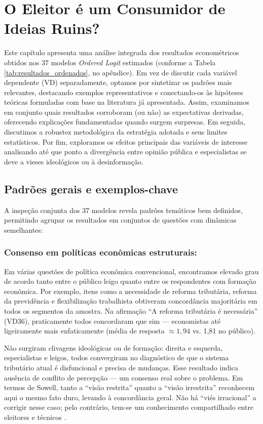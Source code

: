 \chapter{O Eleitor é um Consumidor de Ideias Ruins?} 

Este capítulo apresenta uma análise integrada dos resultados econométricos obtidos nos 37 modelos \emph{Ordered Logit} estimados (conforme a Tabela \ref{tab:resultados_ordenados}, no apêndice). Em vez de discutir cada variável dependente (VD) separadamente, optamos por sintetizar os padrões mais relevantes, destacando exemplos representativos e conectando-os às hipóteses teóricas formuladas com base na literatura já apresentada. Assim, examinamos em conjunto quais resultados corroboram (ou não) as expectativas derivadas, oferecendo explicações fundamentadas quando surgem surpresas. Em seguida, discutimos a robustez metodológica da estratégia adotada e seus limites estatísticos. Por fim, exploramos os efeitos principais das variáveis de interesse analisando até que ponto a divergência entre opinião pública e especialistas se deve a vieses ideológicos ou à desinformação.

\section{Padrões gerais e exemplos-chave} 

A inspeção conjunta dos 37 modelos revela padrões temáticos bem definidos, permitindo agrupar os resultados em conjuntos de questões com dinâmicas semelhantes:

\subsection{Consenso em políticas econômicas estruturais:} 

Em várias questões de política econômica convencional, encontramos elevado grau de acordo tanto entre o público leigo quanto entre os respondentes com formação econômica. Por exemplo, itens como a necessidade de reforma tributária, reforma da previdência e flexibilização trabalhista obtiveram concordância majoritária em todos os segmentos da amostra. Na afirmação “A reforma tributária é necessária” (VD36), praticamente todos concordaram que sim — economistas até ligeiramente mais enfaticamente (média de resposta $\approx 1{,}94$ vs. 1{,}81 no público). 

Não surgiram clivagens ideológicas ou de formação: direita e esquerda, especialistas e leigos, todos convergiram no diagnóstico de que o sistema tributário atual é disfuncional e precisa de mudanças. Esse resultado indica ausência de conflito de percepção — um consenso real sobre o problema. Em termos de Sowell, tanto a “visão restrita” quanto a “visão irrestrita” reconhecem aqui o mesmo fato duro, levando à concordância geral. Não há “viés irracional” a corrigir nesse caso; pelo contrário, tem-se um conhecimento compartilhado entre eleitores e técnicos \cite{sowell2007conflict}.


